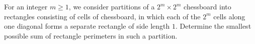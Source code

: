For an integer $m\geq 1$,  we consider partitions of a $2^m\times 2^m$ chessboard into rectangles consisting of cells of chessboard, in which each of the $2^m$ cells along one diagonal forms a separate rectangle of side length $1$. Determine the smallest possible sum of rectangle perimeters in such a partition.
